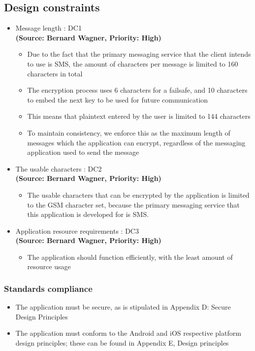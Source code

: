 \subsection{Design constraints}
\begin{itemize}
\item{Message length : DC1}\\
\textbf{(Source: Bernard Wagner, Priority: High)}
\begin{itemize}
\item Due to the fact that the primary messaging service that the client intends to use is SMS, the amount of characters per message is limited to 160 characters in total
\item The encryption process uses 6 characters for a failsafe, and 10 characters to embed the next key to be used for future communication
\item This means that plaintext entered by the user is limited to 144 characters
\item To maintain consistency, we enforce this as the maximum length of messages which the application can encrypt, regardless of the messaging application used to send the message
\end{itemize}
\newpage
\item{The usable characters : DC2}\\
\textbf{(Source: Bernard Wagner, Priority: High)}
\begin{itemize}
\item The usable characters that can be encrypted by the application is limited to the GSM character set, because the primary messaging service that this application is developed for is SMS.
\end{itemize}
\item{Application resource requirements : DC3}\\
\textbf{(Source: Bernard Wagner, Priority: High)}
\begin{itemize}
\item The application should function efficiently, with the least amount of resource usage
\end{itemize}
\end{itemize}
\subsubsection{Standards compliance}
\begin{itemize}
\item The application must be secure, as is stipulated in Appendix D: Secure Design Principles
\item The application must conform to the Android and iOS respective platform design principles; these can be found in Appendix E, Design principles
\end{itemize}

